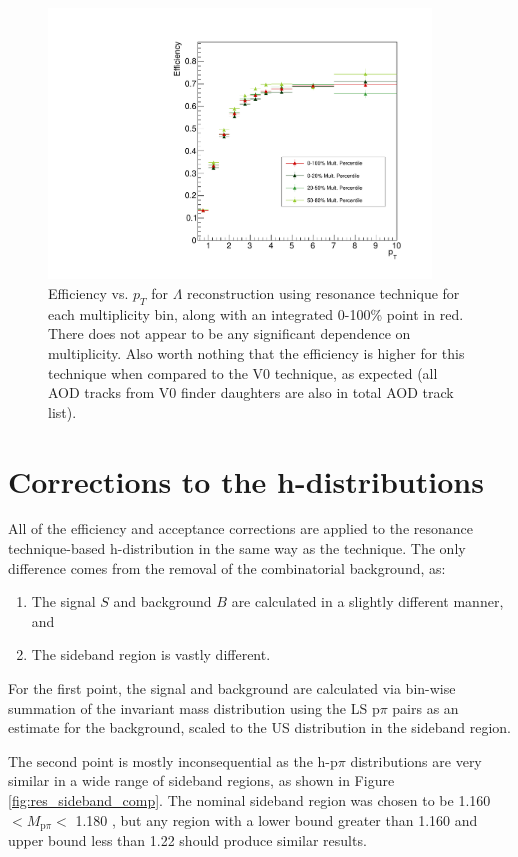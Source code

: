 \begin{figure}[ht]
    \centering
    \includegraphics[width=4in]{figures/analysis/res_efficiency.pdf}
    \caption{Efficiency vs. $p_T$ for $\Lambda$ reconstruction using resonance technique for each multiplicity bin, along with an integrated 0-100\% point in red. There does not appear to be any significant dependence on multiplicity. Also worth nothing that the efficiency is higher for this technique when compared to the V0 technique, as expected (all AOD tracks from V0 finder daughters are also in total AOD track list).}
    \label{fig:lambda_eff_res}
\end{figure}

\section{Corrections to the h-\lmb distributions}
\label{sec:removecomb}

All of the efficiency and acceptance corrections are applied to the resonance technique-based h-\lmb distribution in the same way as the \vz technique. The only difference comes from the removal of the combinatorial background, as:
%
\begin{enumerate}
    \item The signal $S$ and background $B$ are calculated in a slightly different manner, and 
    \item The sideband region is vastly different.
\end{enumerate}
%
For the first point, the signal and background are calculated via bin-wise summation of the invariant mass distribution using the LS p$\pi$ pairs as an estimate for the background, scaled to the US distribution in the sideband region.

The second point is mostly inconsequential as the h-p$\pi$ distributions are very similar in a wide range of sideband regions, as shown in Figure \ref{fig:res_sideband_comp}. The nominal sideband region was chosen to be 1.160 $< M_{\text{p}\pi} < $ 1.180 \GeVmass, but any region with a lower bound greater than 1.160 \GeVmass and upper bound less than 1.22 \GeVmass should produce similar results.

